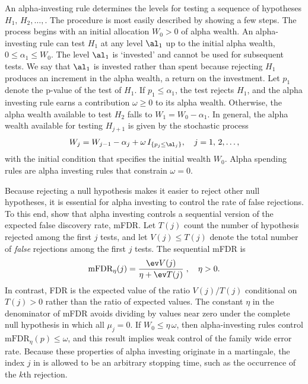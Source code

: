 \documentclass[12pt]{article}
\begin{document}
 An alpha-investing rule \citep{fosterstine08} determines the levels for testing
 a sequence of hypotheses $H_1, \,H_2, \dots,$.  The procedure is most easily described
 by showing a few steps.  The process begins with an initial allocation $W_0 >
 0$ of alpha wealth.    An alpha-investing rule can test $H_1$ at
 any level $\al_1$ up to the initial alpha wealth, $0 \le \alpha_1 \le W_0$.
  The level $\al_1$ is `invested' and cannot be used for subsequent tests.  We
 say that $\al_1$ is invested rather than spent because rejecting $H_1$ produces an 
 increment in the alpha wealth, a return on the investment.  Let $p_1$ denote
 the p-value of the test of $H_1$.  If $p_1 \le \alpha_1$, the test rejects
 $H_1$, and the alpha investing rule earns a contribution $\omega \ge
 0$ to its alpha wealth.  Otherwise, the alpha wealth available to test $H_2$
 falls to $W_1 = W_0 - \alpha_1$.  In general, the alpha wealth available for
 testing $H_{j+1}$ is given by the stochastic process
 \begin{equation}
    W_j = W_{j-1} - \alpha_j + \omega \, I_{\{p_j \le \al_j\}}, 
       \quad j = 1,\,2,\ldots,
 \label{eq:Wj}
 \end{equation}
 with the initial condition that specifies the initial wealth $W_0$.  Alpha
 spending rules are alpha investing rules that constrain $\omega = 0$.


 Because rejecting a null hypothesis makes it easier to reject other null
 hypotheses, it is essential for alpha investing to control the rate of false
 rejections.  To this end, \citet{fosterstine08} show that alpha investing
 controls a sequential version of the expected false discovery rate, mFDR.  Let
 $T(j)$ count the number of hypothesis rejected among the first $j$ tests, and let
 $V(j) \le T(j)$ denote the total number of {\em false} rejections among the
 first $j$ tests.  The sequential mFDR is
 \begin{equation}
    \mbox{mFDR}_\eta(j) = \frac{\ev V(j)}{\eta + \ev T(j)} \;, \quad \eta > 0.
 \label{eq:mFDR}
 \end{equation}
 In contrast, FDR is the expected value of the ratio $V(j)/T(j)$ conditional on
 $T(j)>0$ rather than the ratio of expected values.  The constant $\eta$ in the
 denominator of mFDR avoids dividing by values near zero under the complete null
 hypothesis in which all $\mu_j = 0$.  If $W_0 \le \eta\,\omega$, then
 alpha-investing rules control $\mbox{mFDR}_\eta(p) \le \omega$, and this result
 implies weak control of the family wide error rate.  Because these properties
 of alpha investing originate in a martingale, the index $j$ in  is
 allowed to be an arbitrary stopping time, such as the occurrence of the $k$th
 rejection.
\end{document}
